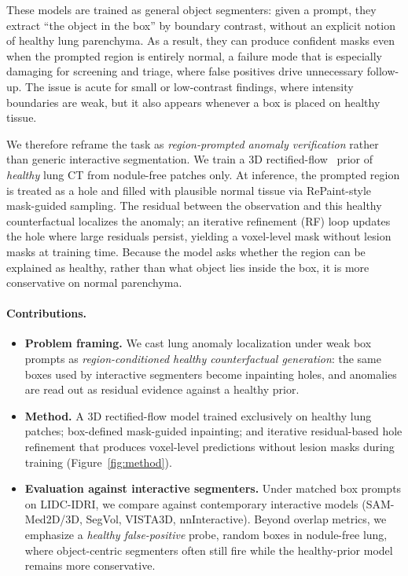 \documentclass[letterpaper]{article} %
\begin{document}
These models are trained as general object segmenters: given a prompt,
they extract ``the object in the box'' by boundary contrast, without an
explicit notion of healthy lung parenchyma. As a result, they can produce
confident masks even when the prompted region is entirely
normal, a failure mode that is especially damaging for screening and
triage, where false positives drive unnecessary follow-up. The issue is
acute for small or low-contrast findings, where intensity boundaries are
weak, but it also appears whenever a box is placed on healthy tissue.

We therefore reframe the task as \emph{region-prompted anomaly
verification} rather than generic interactive segmentation. We train a
3D rectified-flow~\citep{liu2023flow} prior of \emph{healthy} lung CT from nodule-free
patches only. At inference, the prompted region is treated as a hole
and filled with plausible normal tissue via RePaint-style~\citep{lugmayr2022repaint}
mask-guided sampling. The residual between the observation and this
healthy counterfactual localizes the anomaly; an iterative refinement (RF)
loop updates the hole where large residuals persist, yielding a
voxel-level mask without lesion masks at training time. Because the model
asks whether the region can be explained as healthy, rather than what
object lies inside the box, it is more conservative on normal parenchyma.

\paragraph{Contributions.}
\begin{itemize}
\item \textbf{Problem framing.}
    We cast lung anomaly localization under weak box prompts as
    \emph{region-conditioned healthy counterfactual generation}: the same
    boxes used by interactive segmenters become inpainting holes, and
    anomalies are read out as residual evidence against a healthy prior.

\item \textbf{Method.}
    A 3D rectified-flow model trained exclusively on healthy lung patches;
    box-defined mask-guided inpainting; and iterative residual-based hole
    refinement that produces voxel-level predictions without lesion masks
    during training (Figure~\ref{fig:method}).

\item \textbf{Evaluation against interactive segmenters.}
    Under matched box prompts on LIDC-IDRI, we compare against
    contemporary interactive models (SAM-Med2D/3D, SegVol, VISTA3D,
    nnInteractive). Beyond overlap metrics, we emphasize a
    \emph{healthy false-positive} probe, random boxes in nodule-free
    lung, where object-centric segmenters often still fire while the
    healthy-prior model remains more conservative.
\end{itemize}
\end{document}
